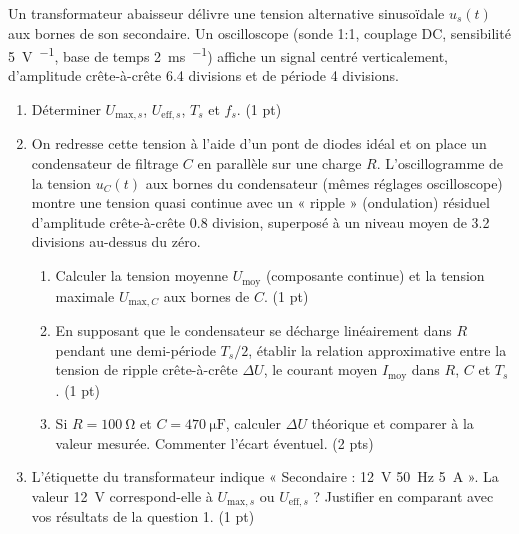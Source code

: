 \documentclass[11pt]{article}
\begin{document}
\begin{exercice}
Un transformateur abaisseur délivre une tension alternative sinusoïdale $u_s(t)$ aux bornes de son secondaire. Un oscilloscope (sonde 1:1, couplage DC, sensibilité \SI{5}{\volt\per\division}, base de temps \SI{2}{\milli\second\per\division}) affiche un signal centré verticalement, d'amplitude crête-à-crête \num{6,4} divisions et de période \num{4} divisions.
\begin{enumerate}
    \item Déterminer $U_{\text{max},s}$, $U_{\text{eff},s}$, $T_s$ et $f_s$. (1 pt)
    \item On redresse cette tension à l'aide d'un pont de diodes idéal et on place un condensateur de filtrage $C$ en parallèle sur une charge $R$. L'oscillogramme de la tension $u_C(t)$ aux bornes du condensateur (mêmes réglages oscilloscope) montre une tension quasi continue avec un « ripple » (ondulation) résiduel d'amplitude crête-à-crête \num{0,8} division, superposé à un niveau moyen de \num{3,2} divisions au-dessus du zéro.
    \begin{enumerate}
        \item Calculer la tension moyenne $U_{\text{moy}}$ (composante continue) et la tension maximale $U_{\text{max},C}$ aux bornes de $C$. (1 pt)
        \item En supposant que le condensateur se décharge linéairement dans $R$ pendant une demi-période $T_s/2$, établir la relation approximative entre la tension de ripple crête-à-crête $\Delta U$, le courant moyen $I_{\text{moy}}$ dans $R$, $C$ et $T_s$. (1 pt)
        \item Si $R = \SI{100}{\ohm}$ et $C = \SI{470}{\micro\farad}$, calculer $\Delta U$ théorique et comparer à la valeur mesurée. Commenter l'écart éventuel. (2 pts)
    \end{enumerate}
    \item L'étiquette du transformateur indique « Secondaire : \SI{12}{\volt} \SI{50}{\hertz} \SI{5}{\ampere} ». La valeur \SI{12}{\volt} correspond-elle à $U_{\text{max},s}$ ou $U_{\text{eff},s}$ ? Justifier en comparant avec vos résultats de la question 1. (1 pt)
\end{enumerate}
\end{exercice}
\end{document}
